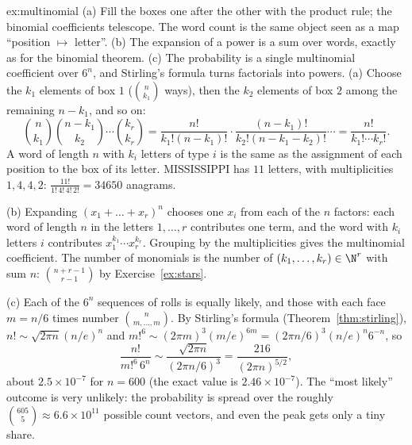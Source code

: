 \begin{solution}{ex:multinomial}
\idea (a) Fill the boxes one after the other with the product rule; the binomial coefficients telescope. The word count is the same object seen as a map ``position $\mapsto$ letter''. (b) The expansion of a power is a sum over words, exactly as for the binomial theorem. (c) The probability is a single multinomial coefficient over $6^n$, and Stirling's formula turns factorials into powers.
\writeup (a) Choose the $k_1$ elements of box $1$ ($\binom n{k_1}$ ways), then the $k_2$ elements of box $2$ among the remaining $n-k_1$, and so on:
\[
\binom n{k_1}\binom{n-k_1}{k_2}\cdots\binom{k_r}{k_r}=\frac{n!}{k_1!(n-k_1)!}\cdot\frac{(n-k_1)!}{k_2!(n-k_1-k_2)!}\cdots=\frac{n!}{k_1!\cdots k_r!}.
\]
A word of length $n$ with $k_i$ letters of type $i$ is the same as the assignment of each position to the box of its letter. MISSISSIPPI has $11$ letters, with multiplicities $1,4,4,2$: $\frac{11!}{1!\,4!\,4!\,2!}=34650$ anagrams.

(b) Expanding $(x_1+\dots+x_r)^n$ chooses one $x_i$ from each of the $n$ factors: each word of length $n$ in the letters $1,\dots,r$ contributes one term, and the word with $k_i$ letters $i$ contributes $x_1^{k_1}\cdots x_r^{k_r}$. Grouping by the multiplicities gives the multinomial coefficient. The number of monomials is the number of $(k_1,\dots,k_r)\in\N^r$ with sum $n$: $\binom{n+r-1}{r-1}$ by Exercise~\ref{ex:stars}.

(c) Each of the $6^n$ sequences of rolls is equally likely, and those with each face $m=n/6$ times number $\binom n{m,\dots,m}$. By Stirling's formula (Theorem~\ref{thm:stirling}), $n!\sim\sqrt{2\pi n}(n/e)^n$ and $m!^6\sim(2\pi m)^3(m/e)^{6m}=(2\pi n/6)^3(n/e)^n6^{-n}$, so
\[
\frac{n!}{m!^6\,6^n}\sim\frac{\sqrt{2\pi n}}{(2\pi n/6)^3}=\frac{216}{(2\pi n)^{5/2}} ,
\]
about $2.5\times10^{-7}$ for $n=600$ (the exact value is $2.46\times10^{-7}$). The ``most likely'' outcome is very unlikely: the probability is spread over the roughly $\binom{605}5\approx6.6\times10^{11}$ possible count vectors, and even the peak gets only a tiny share.
\end{solution}

